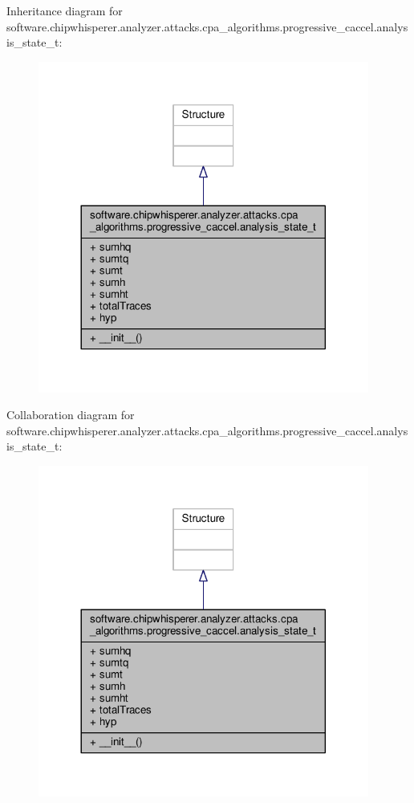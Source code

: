 Inheritance diagram for software.\+chipwhisperer.\+analyzer.\+attacks.\+cpa\+\_\+algorithms.\+progressive\+\_\+caccel.\+analysis\+\_\+state\+\_\+t\+:\nopagebreak
\begin{figure}[H]
\begin{center}
\leavevmode
\includegraphics[width=308pt]{d0/d2e/classsoftware_1_1chipwhisperer_1_1analyzer_1_1attacks_1_1cpa__algorithms_1_1progressive__caccel_451a7ec5723864ad5e9f9f5517090c15}
\end{center}
\end{figure}


Collaboration diagram for software.\+chipwhisperer.\+analyzer.\+attacks.\+cpa\+\_\+algorithms.\+progressive\+\_\+caccel.\+analysis\+\_\+state\+\_\+t\+:\nopagebreak
\begin{figure}[H]
\begin{center}
\leavevmode
\includegraphics[width=308pt]{d3/d9d/classsoftware_1_1chipwhisperer_1_1analyzer_1_1attacks_1_1cpa__algorithms_1_1progressive__caccel_326b89553ca7ce53cdc9d4e780605564}
\end{center}
\end{figure}


